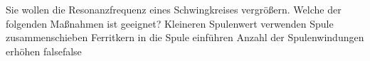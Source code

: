     {Sie wollen die Resonanzfrequenz eines Schwingkreises vergrößern. Welche der folgenden Maßnahmen ist geeignet?}
    {Kleineren Spulenwert verwenden}
    {Spule zusammenschieben}
    {Ferritkern in die Spule einführen}
    {Anzahl der Spulenwindungen erhöhen}
    {false}{false}